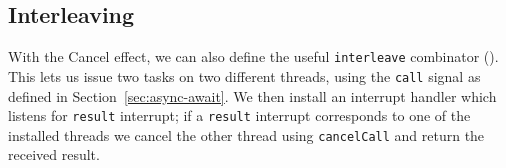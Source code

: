 \documentclass[msc,deptreport,cs]{infthesis} %
\newcommand{\code}[1]{\lstinline{#1}}
\newcommand{\texthighlight}[1]{%
  \colorbox{red!20}{#1}}
\newcommand{\greytext}[1]{\textcolor{black!40}{#1}}
\newcommand{\todo}[1]
           {{\par\noindent\small\color{RoyalPurple}
  \framebox{\parbox{\dimexpr\linewidth-2\fboxsep-2\fboxrule}
    {\textbf{TODO:} #1}}}}
\begin{document}



\subsection{Interleaving}

With the \textsf{Cancel} effect, we can also define the useful \code{interleave}
combinator (\cite{leijen2017structured}).
%
This lets us issue two tasks on two different threads, using the \code{call}
signal as defined in Section~\ref{sec:async-await}. We then install an interrupt
handler which listens for \code{result} interrupt; if a \code{result} interrupt
corresponds to one of the installed threads we cancel the other thread using
\code{cancelCall} and return the received result.




\end{document}
